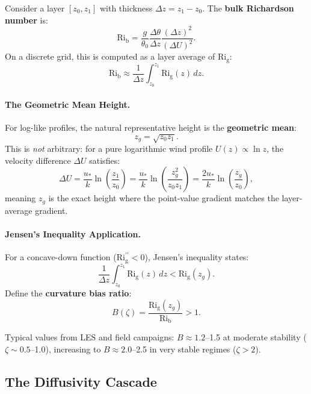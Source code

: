 \documentclass[twocolumn,11pt]{article}
\newcommand{\Rig}{\text{Ri}_{\text{g}}}
\newcommand{\Rib}{\text{Ri}_{\text{b}}}
\begin{document}
Consider a layer $[z_0, z_1]$ with thickness $\Delta z = z_1 - z_0$. The \textbf{bulk Richardson number} is:
\begin{equation}
\Rib = \frac{g}{\theta_0}\frac{\Delta \theta}{\Delta z}\frac{(\Delta z)^2}{(\Delta U)^2}.
\end{equation}
On a discrete grid, this is computed as a layer average of $\Rig$:
\begin{equation}
\Rib \approx \frac{1}{\Delta z}\int_{z_0}^{z_1} \Rig(z)\,dz.
\label{eq:Rib_integral}
\end{equation}

\paragraph{The Geometric Mean Height.} For log-like profiles, the natural representative height is the \textbf{geometric mean}:
\begin{equation}
z_g = \sqrt{z_0 z_1}.
\label{eq:geometric_mean}
\end{equation}
This is \textit{not} arbitrary: for a pure logarithmic wind profile $U(z) \propto \ln z$, the velocity difference $\Delta U$ satisfies:
\begin{equation}
\Delta U = \frac{u_*}{k}\ln\left(\frac{z_1}{z_0}\right) = \frac{u_*}{k}\ln\left(\frac{z_g^2}{z_0 z_1}\right) = \frac{2u_*}{k}\ln\left(\frac{z_g}{z_0}\right),
\end{equation}
meaning $z_g$ is the exact height where the point-value gradient matches the layer-average gradient.

\paragraph{Jensen's Inequality Application.} For a concave-down function ($\Rig^{\prime\prime} < 0$), Jensen's inequality states:
\begin{equation}
\frac{1}{\Delta z}\int_{z_0}^{z_1} \Rig(z)\,dz < \Rig(z_g).
\end{equation}
Define the \textbf{curvature bias ratio}:
\begin{equation}
B(\zeta) = \frac{\Rig(z_g)}{\Rib} > 1.
\label{eq:bias_ratio}
\end{equation}

\noindent Typical values from LES and field campaigns: $B \approx 1.2$--1.5 at moderate stability ($\zeta \sim 0.5$--1.0), increasing to $B \approx 2.0$--2.5 in very stable regimes ($\zeta > 2$).

\subsection{The Diffusivity Cascade}
\end{document}
